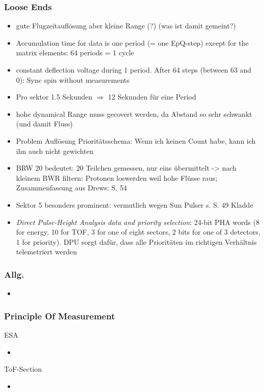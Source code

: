 \documentclass[]{article}
\begin{document}
\subsubsection{Loose Ends}
\begin{itemize}
	\item gute Flugzeitauflösung aber kleine Range (?) (was ist damit gemeint?)
	\item Accumulation time for data is one period (= one EpQ-step) except for the matrix elements: 64 periods = 1 cycle
	\item constant deflection voltage during 1 period. After 64 steps (between 63 and 0): Sync spin without measurements
	\item Pro sektor 1.5 Sekunden $\Rightarrow$ 12 Sekunden für eine Period
	\item hohe dynamical Range muss gecovert werden, da Abstand so sehr schwankt (und damit Fluss)
	\item Problem Auflösung Prioritätsschema: Wenn ich keinen Count habe, kann ich ihn auch nicht gewichten
	\item BRW 20 bedeutet: 20 Teilchen gemessen, nur eins übermittelt -> nach kleinem BWR filtern: Protonen loswerden weil hohe Flüsse raus; Zusammenfassung aus Drews: S. 54
	\item Sektor 5 besonders prominent: vermutlich wegen Sun Pulser s. S. 49 Kladde
	\item \textit{Direct Pulse-Height Analysis data and priority selection}: 24-bit PHA words (8 for energy, 10 for TOF, 3 for one of eight sectors, 2 bits for one of 3 detectors, 1 for priority). DPU sorgt dafür, dass alle Prioritäten im richtigen Verhältnis telemetriert werden
\end{itemize}
\subsubsection{Allg.}
\begin{itemize}
	\item

\end{itemize}

\subsubsection{Principle Of Measurement}
ESA
\begin{itemize}
	\item
\end{itemize}
ToF-Section
\begin{itemize}
	\item
\end{itemize}
%
%
%
\end{document}
